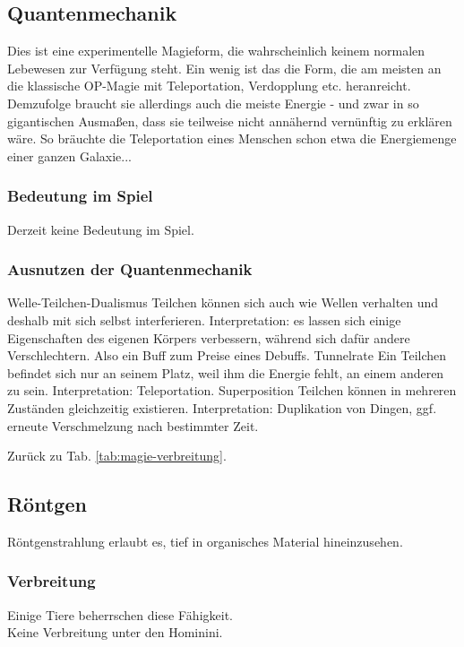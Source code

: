 \subsection{Quantenmechanik}\label{magie:quantenmechanik}
Dies ist eine experimentelle Magieform, die wahrscheinlich keinem normalen Lebewesen zur Verfügung steht.
Ein wenig ist das die Form, die am meisten an die klassische OP-Magie mit Teleportation, Verdopplung etc. heranreicht.
Demzufolge braucht sie allerdings auch die meiste Energie - und zwar in so gigantischen Ausmaßen, dass sie teilweise nicht annähernd vernünftig zu erklären wäre.
So bräuchte die Teleportation eines Menschen schon etwa die Energiemenge einer ganzen Galaxie...

\subsubsection{Bedeutung im Spiel}
Derzeit keine Bedeutung im Spiel.

\subsubsection{Ausnutzen der Quantenmechanik}
\begin{outline}
	\1 Welle-Teilchen-Dualismus
		\2 Teilchen können sich auch wie Wellen verhalten und deshalb mit sich selbst interferieren.
		\2 Interpretation: es lassen sich einige Eigenschaften des eigenen Körpers verbessern, während sich dafür andere Verschlechtern.
		Also ein Buff zum Preise eines Debuffs.
	\1 Tunnelrate
		\2 Ein Teilchen befindet sich nur an seinem Platz, weil ihm die Energie fehlt, an einem anderen zu sein.
		\2 Interpretation: Teleportation.
	\1 Superposition
		\2 Teilchen können in mehreren Zuständen gleichzeitig existieren.
		\2 Interpretation: Duplikation von Dingen, ggf. erneute Verschmelzung nach bestimmter Zeit.
\end{outline}
Zurück zu Tab. \ref{tab:magie-verbreitung}.



\subsection{Röntgen}\label{magie:roentgen}
Röntgenstrahlung erlaubt es, tief in organisches Material hineinzusehen. 

\subsubsection{Verbreitung}
Einige Tiere beherrschen diese Fähigkeit. \\
Keine Verbreitung unter den Hominini.


